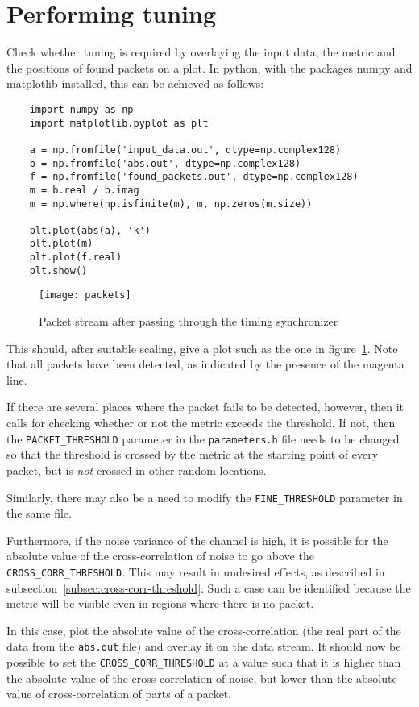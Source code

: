 
\section{Performing tuning}

Check whether tuning is required by overlaying the input data, the metric and
the positions of found packets on a plot. In python, with the packages numpy
\citep{Oliphant2007} and matplotlib \citep{Hunter2007} installed, this can be
achieved as follows:

\lstset{language=Python}
\begin{lstlisting}
	import numpy as np
	import matplotlib.pyplot as plt

	a = np.fromfile('input_data.out', dtype=np.complex128)
	b = np.fromfile('abs.out', dtype=np.complex128)
	f = np.fromfile('found_packets.out', dtype=np.complex128)
	m = b.real / b.imag
	m = np.where(np.isfinite(m), m, np.zeros(m.size))
	
	plt.plot(abs(a), 'k')
	plt.plot(m)
	plt.plot(f.real)
	plt.show()
\end{lstlisting}
\lstset{language=C++}

\begin{figure}[h]
	\centering
	\texttt{[image: packets]}
	\caption{Packet stream after passing through the timing synchronizer}
	\label{fig:packets}
\end{figure}

This should, after suitable scaling, give a plot such as the one in
figure~\ref{fig:packets}. Note that all packets have been detected, as
indicated by the presence of the magenta line.

If there are several places where the packet fails to be detected, however,
then it calls for checking whether or not the metric exceeds the threshold. If
not, then the \lstinline!PACKET_THRESHOLD! parameter in the
\texttt{parameters.h} file needs to be changed so that the threshold is crossed
by the metric at the starting point of every packet, but is \emph{not} crossed
in other random locations.

Similarly, there may also be a need to modify the \lstinline!FINE_THRESHOLD!
parameter in the same file.

Furthermore, if the noise variance of the channel is high, it is possible for
the absolute value of the cross-correlation of noise to go above the
\lstinline!CROSS_CORR_THRESHOLD!. This may result in undesired effects, as
described in subsection~\ref{subsec:cross-corr-threshold}. Such a case can be
identified because the metric will be visible even in regions where there is no
packet.

In this case, plot the absolute value of the cross-correlation (the real part
of the data from the \texttt{abs.out} file) and overlay it on the data stream.
It should now be possible to set the \lstinline!CROSS_CORR_THRESHOLD! at a
value such that it is higher than the absolute value of the cross-correlation
of noise, but lower than the absolute value of cross-correlation of parts of a
packet.
